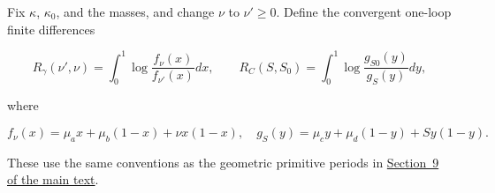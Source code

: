 \documentclass[11pt,a4paper,oneside]{article}
\theoremstyle{plain}
\theoremstyle{definition}
\theoremstyle{remark}
\numberwithin{equation}{section}
\newcommand{\otherref}[2]{\href{#1.pdf}{#2}}
\begin{document}
Fix \(\kappa \), \(\kappa _0\), and the masses, and change \(\nu \) to \(\nu '\ge 0\). Define the convergent one-loop finite differences

\begin{equation}
R_\gamma(\nu',\nu)=\int_0^1
              \log\frac{f_\nu(x)}{f_{\nu'}(x)}dx,\qquad
 R_C(S,S_0)=\int_0^1\log\frac{g_{S0}(y)}{g_S(y)}dy,             \label{eq:forest:19}
\end{equation}

where

\begin{equation}
f_\nu(x)=\mu_a x+\mu_b(1-x)+\nu x(1-x),\quad
 g_S(y)=\mu_c y+\mu_d(1-y)+S y(1-y).
\end{equation}

These use the same conventions as the geometric primitive periods in \otherref{feynman_periods_long_paper_en}{Section~9 of the main text}.
\end{document}
